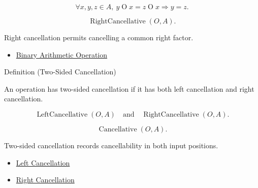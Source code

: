 \begin{remark*}
\[
\forall x,y,z\in A,\ y\mathbin{O}x=z\mathbin{O}x \Longrightarrow y=z.
\]
\end{remark*}

\begin{remark*}
\[
\operatorname{RightCancellative}(O,A).
\]
\end{remark*}

\begin{remark*}[Interpretation]
Right cancellation permits cancelling a common right factor.
\end{remark*}

\begin{dependencies}
\begin{itemize}
  \item \hyperref[def:binary-arithmetic-operation]{Binary Arithmetic Operation}
\end{itemize}
\end{dependencies}

\begin{definitionbox}{Definition (Two-Sided Cancellation)}
\begin{definition}
\label{def:two-sided-cancellation}
An operation has two-sided cancellation if it has both left cancellation and
right cancellation.
\end{definition}
\end{definitionbox}

\begin{remark*}
\[
\operatorname{LeftCancellative}(O,A)
\quad\text{and}\quad
\operatorname{RightCancellative}(O,A).
\]
\end{remark*}

\begin{remark*}
\[
\operatorname{Cancellative}(O,A).
\]
\end{remark*}

\begin{remark*}[Interpretation]
Two-sided cancellation records cancellability in both input positions.
\end{remark*}

\begin{dependencies}
\begin{itemize}
  \item \hyperref[def:left-cancellation]{Left Cancellation}
  \item \hyperref[def:right-cancellation]{Right Cancellation}
\end{itemize}
\end{dependencies}

